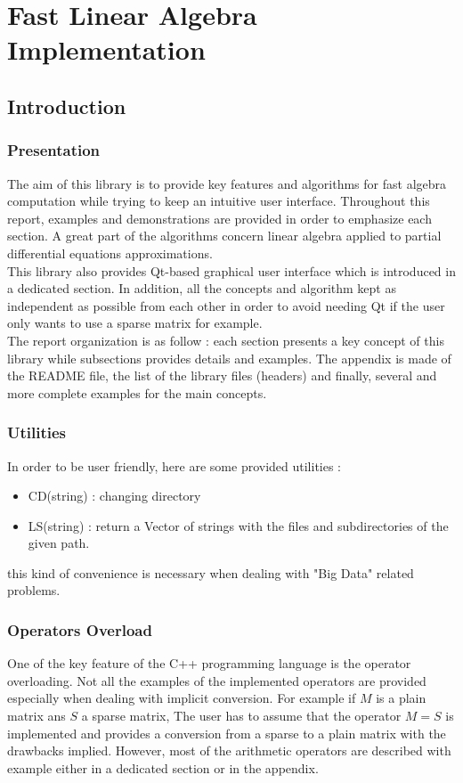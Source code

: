 \documentclass[a4paper]{report}
\begin{document}
\part{Fast Linear Algebra Implementation}
\chapter{Introduction}
\section{Presentation}
The aim of this library is to provide key features and algorithms for fast algebra computation while trying to keep an intuitive user interface. Throughout this report, examples and demonstrations are provided in order to emphasize each section. A great part of the algorithms concern linear algebra applied to partial differential equations approximations.\\
This library also provides Qt-based graphical user interface which is introduced in a dedicated section. In addition, all the concepts and algorithm kept as independent as possible from each other in order to avoid needing Qt if the user only wants to use a sparse matrix for example.
\\
The report organization is as follow : each section presents a key concept of this library while subsections provides details and examples. The appendix is made of the README file, the list of the library files (headers) and finally, several and more complete examples for the main concepts.
\section{Utilities}
In order to be user friendly, here are some provided utilities :
\begin{itemize}
\item CD(string) : changing directory
\item LS(string) : return a Vector of strings with the files and subdirectories of the given path.
\end{itemize}
this kind of convenience is necessary when dealing with "Big Data" related problems.
\section{Operators Overload}
One of the key feature of the C++ programming language is the operator overloading. Not all the examples of the implemented operators are provided especially when dealing with implicit conversion. For example if $M$ is a plain matrix ans $S$ a sparse matrix, The user has to assume that the operator $M=S$ is implemented and provides a conversion from a sparse to a plain matrix with the drawbacks implied. However, most of the arithmetic operators are described with example either in a dedicated section or in the appendix.
\end{document}

